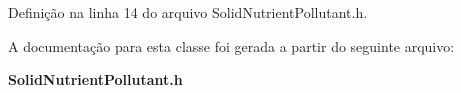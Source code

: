 Definição na linha 14 do arquivo Solid\+Nutrient\+Pollutant.\+h.



A documentação para esta classe foi gerada a partir do seguinte arquivo\+:\begin{DoxyCompactItemize}
\item 
{\bf Solid\+Nutrient\+Pollutant.\+h}\end{DoxyCompactItemize}
